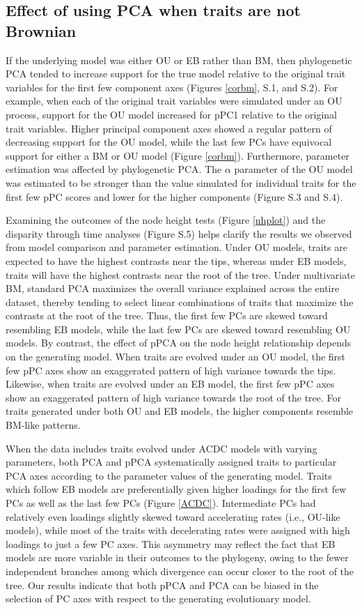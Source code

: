 \documentclass[a4paper,11pt]{article}
\begin{document}
\subsection{Effect of using PCA when traits are not Brownian}
If the underlying model was either OU or EB rather than BM, then phylogenetic PCA tended to increase support for the true model relative to the original trait variables for the first few component axes (Figures \ref{corbm}, S.1, and S.2). For example, when each of the original trait variables were simulated under an OU process, support for the OU model increased for pPC1 relative to the original trait variables. Higher principal component axes showed a regular pattern of decreasing support for the OU model, while the last few PCs have equivocal support for either a BM or OU model (Figure \ref{corbm}). Furthermore, parameter estimation was affected by phylogenetic PCA. The $\alpha$ parameter of the OU model was estimated to be stronger than the value simulated for individual traits for the first few pPC scores and lower for the higher components (Figure S.3 and S.4). 

Examining the outcomes of the node height tests (Figure \ref{nhplot}) and the disparity through time analyses (Figure S.5) helps clarify the results we observed from model comparison and parameter estimation. Under OU models, traits are expected to have the highest contrasts near the tips, whereas under EB models, traits will have the highest contrasts near the root of the tree. Under multivariate BM, standard PCA maximizes the overall variance explained across the entire dataset, thereby tending to select linear combinations of traits that maximize the contrasts at the root of the tree. Thus, the first few PCs are skewed toward resembling EB models, while the last few PCs are skewed toward resembling OU models. By contrast, the effect of pPCA on the node height relationship depends on the generating model. When traits are evolved under an OU model, the first few pPC axes show an exaggerated pattern of high variance towards the tips. Likewise, when traits are evolved under an EB model, the first few pPC axes show an exaggerated pattern of high variance towards the root of the tree. For traits generated under both OU and EB models, the higher components resemble BM-like patterns. 

When the data includes traits evolved under ACDC models with varying parameters, both PCA and pPCA systematically assigned traits to particular PCA axes according to the parameter values of the generating model. Traits which follow EB models are preferentially given higher loadings for the first few PCs as well as the last few PCs (Figure \ref{ACDC}). Intermediate PCs had relatively even loadings slightly skewed toward accelerating rates (i.e., OU-like models), while most of the traits with decelerating rates were assigned with high loadings to just a few PC axes. This asymmetry may reflect the fact that EB models are more variable in their outcomes to the phylogeny, owing to the fewer independent branches among which divergence can occur closer to the root of the tree. Our results indicate that both pPCA and PCA can be biased in the selection of PC axes with respect to the generating evolutionary model.
\end{document}
